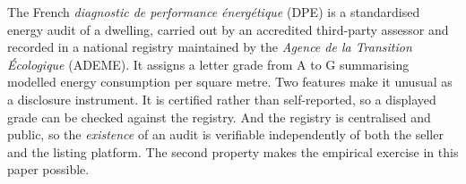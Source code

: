 The French \emph{diagnostic de performance \'energ\'etique} (DPE) is a standardised energy audit of
a dwelling, carried out by an accredited third-party assessor and recorded in a national registry
maintained by the \emph{Agence de la Transition \'Ecologique} (ADEME). It assigns a letter grade
from A to G summarising modelled energy consumption per square metre. Two features make it
unusual as a disclosure instrument. It is certified rather than self-reported, so a displayed
grade can be checked against the registry. And the registry is centralised and public, so the
\emph{existence} of an audit is verifiable independently of both the seller and the listing
platform. The second property makes the empirical exercise in this paper possible.
